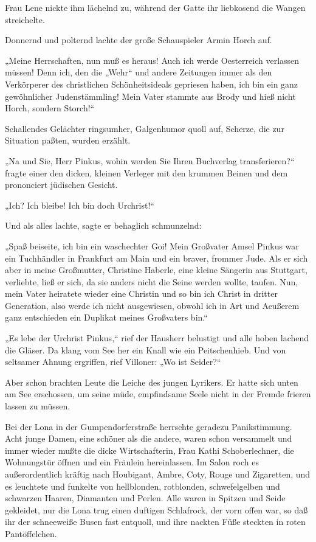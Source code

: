 Frau Lene nickte ihm lächelnd zu, während der Gatte ihr liebkosend
die Wangen streichelte.

Donnernd und polternd lachte der große Schauspieler Armin Horch
auf.

„Meine Herrschaften, nun muß es heraus! Auch ich werde Oesterreich
verlassen müssen! Denn ich, den die „Wehr“ und andere Zeitungen
immer als den Verkörperer des christlichen Schönheitsideals
gepriesen haben, ich bin ein ganz gewöhnlicher Judenstämmling! Mein
Vater stammte aus Brody und hieß nicht Horch, sondern Storch!“

Schallendes Gelächter ringsumher, Galgenhumor quoll auf, Scherze,
die zur Situation paßten, wurden erzählt.

„Na und Sie, Herr Pinkus, wohin werden Sie Ihren Buchverlag
transferieren?“ fragte einer den dicken, kleinen Verleger mit den
krummen Beinen und dem prononciert jüdischen Gesicht.

„Ich? Ich bleibe! Ich bin doch Urchrist!“

Und als alles lachte, sagte er behaglich schmunzelnd:

„Spaß beiseite, ich bin ein waschechter Goi! Mein
Großvater Amsel Pinkus war ein Tuchhändler in Frankfurt am Main und
ein braver, frommer Jude. Als er sich aber in meine Großmutter,
Christine Haberle, eine kleine Sängerin aus Stuttgart, verliebte,
ließ er sich, da sie anders nicht die Seine werden wollte, taufen.
Nun, mein Vater heiratete wieder eine Christin und so bin ich
Christ in dritter Generation, also werde ich nicht ausgewiesen,
obwohl ich in Art und Aeußerem ganz entschieden ein Duplikat meines
Großvaters bin.“

„Es lebe der Urchrist Pinkus,“ rief der Hausherr belustigt und alle
hoben lachend die Gläser. Da klang vom See her ein Knall wie ein
Peitschenhieb. Und von seltsamer Ahnung ergriffen, rief Villoner:
„Wo ist Seider?“

Aber schon brachten Leute die Leiche des jungen Lyrikers. Er hatte
sich unten am See erschossen, um seine müde, empfindsame Seele
nicht in der Fremde frieren lassen zu müssen.

\tb{* * *}
Bei der Lona in der Gumpendorferstraße herrschte geradezu
Panikstimmung. Acht junge Damen, eine schöner als die andere, waren
schon versammelt und immer wieder mußte die dicke Wirtschafterin,
Frau Kathi Schoberlechner, die Wohnungstür öffnen und ein Fräulein
hereinlassen. Im Salon roch es außerordentlich kräftig nach
Houbigant, Ambre, Coty, Rouge und Zigaretten, und es leuchtete und
funkelte von hellblonden, rotblonden, schwefelgelben und schwarzen
Haaren, Diamanten und Perlen. Alle waren in  Spitzen
und Seide gekleidet, nur die Lona trug einen duftigen Schlafrock,
der vorn offen war, so daß ihr der schneeweiße Busen fast entquoll,
und ihre nackten Füße steckten in roten Pantöffelchen.

